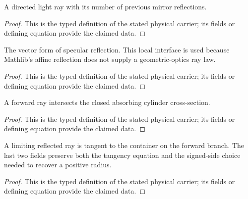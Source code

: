 \begin{definition}
  \label{def:physics:IPhO_2026_2_B_1:aux018}
  A directed light ray with its number of previous mirror reflections.
\end{definition}
\begin{proof}
  This is the typed definition of the stated physical carrier; its fields or defining equation provide the claimed data.
\end{proof}

\begin{definition}
  \label{def:physics:IPhO_2026_2_B_1:aux019}
  The vector form of specular reflection. This local interface is used because Mathlib's affine reflection does not supply a geometric-optics ray law.
\end{definition}
\begin{proof}
  This is the typed definition of the stated physical carrier; its fields or defining equation provide the claimed data.
\end{proof}

\begin{definition}
  \label{def:physics:IPhO_2026_2_B_1:aux020}
  A forward ray intersects the closed absorbing cylinder cross-section.
\end{definition}
\begin{proof}
  This is the typed definition of the stated physical carrier; its fields or defining equation provide the claimed data.
\end{proof}

\begin{definition}
  \label{def:physics:IPhO_2026_2_B_1:aux021}
  A limiting reflected ray is tangent to the container on the forward branch. The last two fields preserve both the tangency equation and the signed-side choice needed to recover a positive radius.
\end{definition}
\begin{proof}
  This is the typed definition of the stated physical carrier; its fields or defining equation provide the claimed data.
\end{proof}

